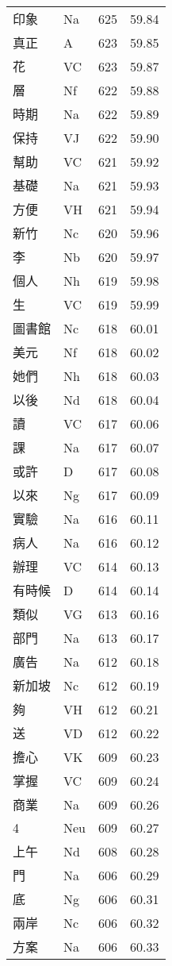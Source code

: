 \documentclass[twocolumn]{book}
\begin{document}
\begin{supertabular}{llrr}
印象 & Na & 625 &  59.84\\
真正 & A & 623 &  59.85\\
花 & VC & 623 &  59.87\\
層 & Nf & 622 &  59.88\\
時期 & Na & 622 &  59.89\\
保持 & VJ & 622 &  59.90\\
幫助 & VC & 621 &  59.92\\
基礎 & Na & 621 &  59.93\\
方便 & VH & 621 &  59.94\\
新竹 & Nc & 620 &  59.96\\
李 & Nb & 620 &  59.97\\
個人 & Nh & 619 &  59.98\\
生 & VC & 619 &  59.99\\
圖書館 & Nc & 618 &  60.01\\
美元 & Nf & 618 &  60.02\\
她們 & Nh & 618 &  60.03\\
以後 & Nd & 618 &  60.04\\
讀 & VC & 617 &  60.06\\
課 & Na & 617 &  60.07\\
或許 & D & 617 &  60.08\\
以來 & Ng & 617 &  60.09\\
實驗 & Na & 616 &  60.11\\
病人 & Na & 616 &  60.12\\
辦理 & VC & 614 &  60.13\\
有時候 & D & 614 &  60.14\\
類似 & VG & 613 &  60.16\\
部門 & Na & 613 &  60.17\\
廣告 & Na & 612 &  60.18\\
新加坡 & Nc & 612 &  60.19\\
夠 & VH & 612 &  60.21\\
送 & VD & 612 &  60.22\\
擔心 & VK & 609 &  60.23\\
掌握 & VC & 609 &  60.24\\
商業 & Na & 609 &  60.26\\
4 & Neu & 609 &  60.27\\
上午 & Nd & 608 &  60.28\\
門 & Na & 606 &  60.29\\
底 & Ng & 606 &  60.31\\
兩岸 & Nc & 606 &  60.32\\
方案 & Na & 606 &  60.33\\

\end{supertabular}
\end{document}
